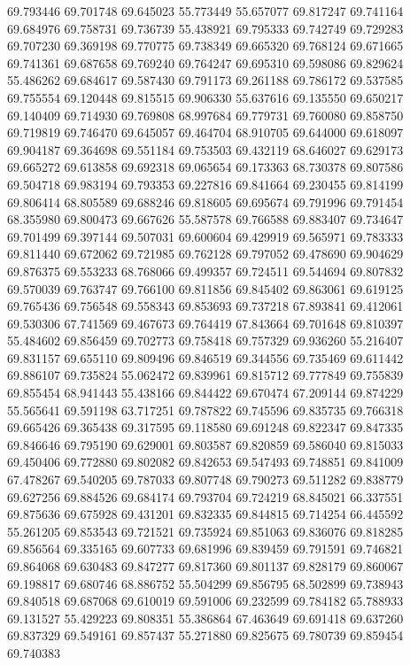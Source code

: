 69.793446
69.701748
69.645023
55.773449
55.657077
69.817247
69.741164
69.684976
69.758731
69.736739
55.438921
69.795333
69.742749
69.729283
69.707230
69.369198
69.770775
69.738349
69.665320
69.768124
69.671665
69.741361
69.687658
69.769240
69.764247
69.695310
69.598086
69.829624
55.486262
69.684617
69.587430
69.791173
69.261188
69.786172
69.537585
69.755554
69.120448
69.815515
69.906330
55.637616
69.135550
69.650217
69.140409
69.714930
69.769808
68.997684
69.779731
69.760080
69.858750
69.719819
69.746470
69.645057
69.464704
68.910705
69.644000
69.618097
69.904187
69.364698
69.551184
69.753503
69.432119
68.646027
69.629173
69.665272
69.613858
69.692318
69.065654
69.173363
68.730378
69.807586
69.504718
69.983194
69.793353
69.227816
69.841664
69.230455
69.814199
69.806414
68.805589
69.688246
69.818605
69.695674
69.791996
69.791454
68.355980
69.800473
69.667626
55.587578
69.766588
69.883407
69.734647
69.701499
69.397144
69.507031
69.600604
69.429919
69.565971
69.783333
69.811440
69.672062
69.721985
69.762128
69.797052
69.478690
69.904629
69.876375
69.553233
68.768066
69.499357
69.724511
69.544694
69.807832
69.570039
69.763747
69.766100
69.811856
69.845402
69.863061
69.619125
69.765436
69.756548
69.558343
69.853693
69.737218
67.893841
69.412061
69.530306
67.741569
69.467673
69.764419
67.843664
69.701648
69.810397
55.484602
69.856459
69.702773
69.758418
69.757329
69.936260
55.216407
69.831157
69.655110
69.809496
69.846519
69.344556
69.735469
69.611442
69.886107
69.735824
55.062472
69.839961
69.815712
69.777849
69.755839
69.855454
68.941443
55.438166
69.844422
69.670474
67.209144
69.874229
55.565641
69.591198
63.717251
69.787822
69.745596
69.835735
69.766318
69.665426
69.365438
69.317595
69.118580
69.691248
69.822347
69.847335
69.846646
69.795190
69.629001
69.803587
69.820859
69.586040
69.815033
69.450406
69.772880
69.802082
69.842653
69.547493
69.748851
69.841009
67.478267
69.540205
69.787033
69.807748
69.790273
69.511282
69.838779
69.627256
69.884526
69.684174
69.793704
69.724219
68.845021
66.337551
69.875636
69.675928
69.431201
69.832335
69.844815
69.714254
66.445592
55.261205
69.853543
69.721521
69.735924
69.851063
69.836076
69.818285
69.856564
69.335165
69.607733
69.681996
69.839459
69.791591
69.746821
69.864068
69.630483
69.847277
69.817360
69.801137
69.828179
69.860067
69.198817
69.680746
68.886752
55.504299
69.856795
68.502899
69.738943
69.840518
69.687068
69.610019
69.591006
69.232599
69.784182
65.788933
69.131527
55.429223
69.808351
55.386864
67.463649
69.691418
69.637260
69.837329
69.549161
69.857437
55.271880
69.825675
69.780739
69.859454
69.740383
